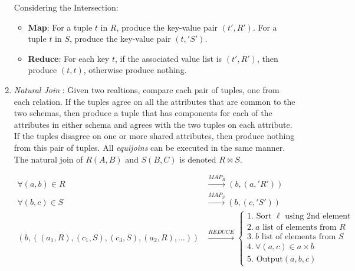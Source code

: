 \begin{enumerate}
    Considering the Intersection: 
    \begin{itemize}
        \item \textbf{Map}: For a tuple $t$ in $R$, produce the key-value pair $(t', R')$. For a tuple $t$ in $S$, produce the key-value pair $(t, 'S')$.
        \item \textbf{Reduce}: For each key $t$, if the associated value list is $(t', R')$, then produce $(t, t)$, otherwise produce nothing.
    \end{itemize}

\item \textit{Natural Join} \label{item:natural-join}: Given two realtions, compare each pair of tuples, one from each relation. If the tuples agree on all the attributes that are common to the two schemas, then produce a tuple that has components for each of the attributes in either schema and agrees with the two tuples on each attribute. If the tuples disagree on one or more shared attributes, then produce nothing from this pair of tuples. All \textit{equijoins} can be executed in the same manner. The natural join of $R(A,B)$ and $S(B,C)$ is denoted $R \bowtie S$. 
    
    \begin{equation*}
        \begin{split}
                                          \forall (a,b)\in R & \xrightarrow{MAP_R} (b,(a, 'R')) \\
                                          \forall (b,c)\in S & \xrightarrow{MAP_S} (b, (c, 'S')) \\
            (b, ((a_1,R),(c_1, S), (c_3, S),(a_2, R),\dots)) & \xrightarrow{REDUCE} \begin{cases}
                                                                                        1. \text{ Sort } \ell \text{ using 2nd element} \\ 
                                                                                        2. \ a \text{ list of elements from } R \\
                                                                                        3. \ b \text{ list of elements from } S \\
                                                                                        4. \ \forall (a, c) \in a \times b \\ 
                                                                                        5. \text{ Output} (a, b, c)
                                                                                    \end{cases}
        \end{split}
    \end{equation*}


\end{enumerate}
